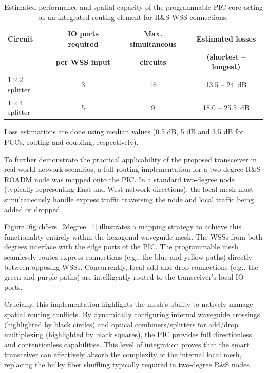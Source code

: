 \begin{table}[htpb]
    \centering
    \caption{Estimated performance and spatial capacity of the programmable PIC core acting as an 
    integrated routing element for R\&S WSS connections.}
    \label{tab:ch5-rs_scalability}
    \begin{tabular}{lccc}
        \hline
        \textbf{Circuit} & \textbf{IO ports required} & \textbf{Max. simultaneous} & 
        \textbf{Estimated losses} \\
        & \textbf{per WSS input} & \textbf{circuits} & \textbf{(shortest -- longest)} \\
        \hline
        $1\times 2$ splitter & 3 & 16 & 13.5 -- 24~dB \\
        $1\times 4$ splitter & 5 & 9  & 18.0 -- 25.5~dB \\
        \hline
    \end{tabular}
    \parbox{0.82\textwidth}{\footnotesize Loss estimations are done using median values 
    (0.5 dB, 5 dB and 3.5 dB for PUCs, routing and coupling, respectively).}
\end{table}


To further demonstrate the practical applicability of the proposed transceiver in real-world 
network scenarios, a full routing implementation for a two-degree R\&S ROADM node was mapped onto 
the PIC. In a standard two-degree node (typically representing East and West network directions), 
the local mesh must simultaneously handle express traffic traversing the node and local traffic 
being added or dropped.

Figure \ref{fig:ch5-rs_2degree_1} illustrates a mapping strategy to achieve this functionality 
entirely within the hexagonal waveguide mesh. The WSSs from both degrees interface with the edge 
ports of the PIC. The programmable mesh seamlessly routes express connections (e.g., the blue and 
yellow paths) directly between opposing WSSs. Concurrently, local add and drop connections (e.g., 
the green and purple paths) are intelligently routed to the transceiver's local IO ports. 

Crucially, this implementation highlights the mesh's ability to natively manage spatial routing 
conflicts. By dynamically configuring internal waveguide crossings (highlighted by black circles) 
and optical combiners/splitters for add/drop multiplexing (highlighted by black squares), the PIC 
provides full directionless and contentionless capabilities. This level of integration proves that 
the smart transceiver can effectively absorb the complexity of the internal local mesh, replacing 
the bulky fiber shuffling typically required in two-degree R\&S nodes.

